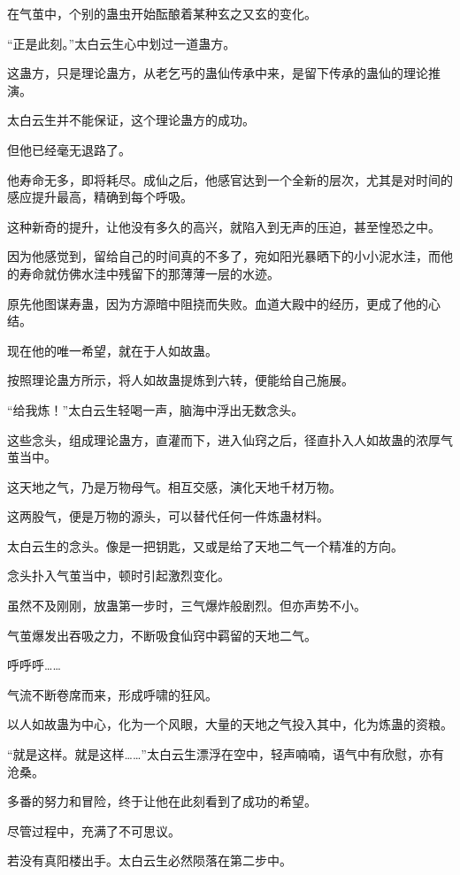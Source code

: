 \begin{this_body}
在气茧中，个别的蛊虫开始酝酿着某种玄之又玄的变化。

“正是此刻。”太白云生心中划过一道蛊方。

这蛊方，只是理论蛊方，从老乞丐的蛊仙传承中来，是留下传承的蛊仙的理论推演。

太白云生并不能保证，这个理论蛊方的成功。

但他已经毫无退路了。

他寿命无多，即将耗尽。成仙之后，他感官达到一个全新的层次，尤其是对时间的感应提升最高，精确到每个呼吸。

这种新奇的提升，让他没有多久的高兴，就陷入到无声的压迫，甚至惶恐之中。

因为他感觉到，留给自己的时间真的不多了，宛如阳光暴晒下的小小泥水洼，而他的寿命就仿佛水洼中残留下的那薄薄一层的水迹。

原先他图谋寿蛊，因为方源暗中阻挠而失败。血道大殿中的经历，更成了他的心结。

现在他的唯一希望，就在于人如故蛊。

按照理论蛊方所示，将人如故蛊提炼到六转，便能给自己施展。

“给我炼！”太白云生轻喝一声，脑海中浮出无数念头。

这些念头，组成理论蛊方，直灌而下，进入仙窍之后，径直扑入人如故蛊的浓厚气茧当中。

这天地之气，乃是万物母气。相互交感，演化天地千材万物。

这两股气，便是万物的源头，可以替代任何一件炼蛊材料。

太白云生的念头。像是一把钥匙，又或是给了天地二气一个精准的方向。

念头扑入气茧当中，顿时引起激烈变化。

虽然不及刚刚，放蛊第一步时，三气爆炸般剧烈。但亦声势不小。

气茧爆发出吞吸之力，不断吸食仙窍中羁留的天地二气。

呼呼呼……

气流不断卷席而来，形成呼啸的狂风。

以人如故蛊为中心，化为一个风眼，大量的天地之气投入其中，化为炼蛊的资粮。

“就是这样。就是这样……”太白云生漂浮在空中，轻声喃喃，语气中有欣慰，亦有沧桑。

多番的努力和冒险，终于让他在此刻看到了成功的希望。

尽管过程中，充满了不可思议。

若没有真阳楼出手。太白云生必然陨落在第二步中。


\end{this_body}
